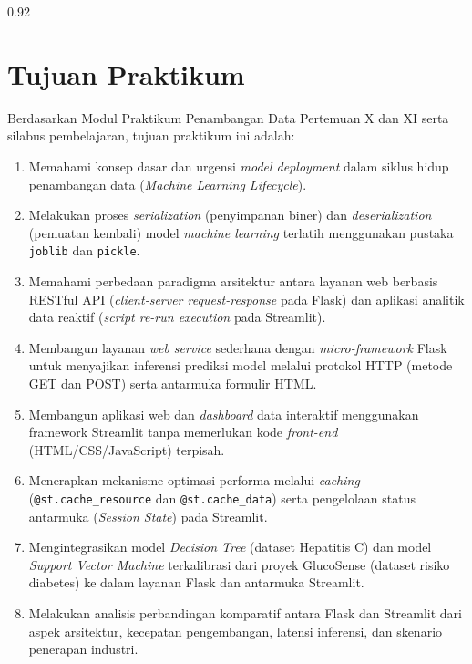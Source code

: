 \documentclass[a4paper,oneside,12pt]{report}
\begin{document}
\begin{spacing}{0.92}
	\tableofcontents
\end{spacing}
\clearpage

\setcounter{page}{3}

\chapter[Tujuan Praktikum]{Tujuan Praktikum}
Berdasarkan Modul Praktikum Penambangan Data Pertemuan X dan XI serta silabus pembelajaran, tujuan praktikum ini adalah:
\begin{enumerate}[noitemsep, topsep=4pt, parsep=2pt]
	\item Memahami konsep dasar dan urgensi \textit{model deployment} dalam siklus hidup penambangan data (\textit{Machine Learning Lifecycle}).
	\item Melakukan proses \textit{serialization} (penyimpanan biner) dan \textit{deserialization} (pemuatan kembali) model \textit{machine learning} terlatih menggunakan pustaka \texttt{joblib} dan \texttt{pickle}.
	\item Memahami perbedaan paradigma arsitektur antara layanan web berbasis RESTful API (\textit{client-server request-response} pada Flask) dan aplikasi analitik data reaktif (\textit{script re-run execution} pada Streamlit).
	\item Membangun layanan \textit{web service} sederhana dengan \textit{micro-framework} Flask untuk menyajikan inferensi prediksi model melalui protokol HTTP (metode GET dan POST) serta antarmuka formulir HTML.
	\item Membangun aplikasi web dan \textit{dashboard} data interaktif menggunakan framework Streamlit tanpa memerlukan kode \textit{front-end} (HTML/CSS/JavaScript) terpisah.
	\item Menerapkan mekanisme optimasi performa melalui \textit{caching} (\texttt{@st.cache\_resource} dan \texttt{@st.cache\_data}) serta pengelolaan status antarmuka (\textit{Session State}) pada Streamlit.
	\item Mengintegrasikan model \textit{Decision Tree} (dataset Hepatitis C) dan model \textit{Support Vector Machine} terkalibrasi dari proyek GlucoSense (dataset risiko diabetes) ke dalam layanan Flask dan antarmuka Streamlit.
	\item Melakukan analisis perbandingan komparatif antara Flask dan Streamlit dari aspek arsitektur, kecepatan pengembangan, latensi inferensi, dan skenario penerapan industri.
\end{enumerate}
\end{document}
